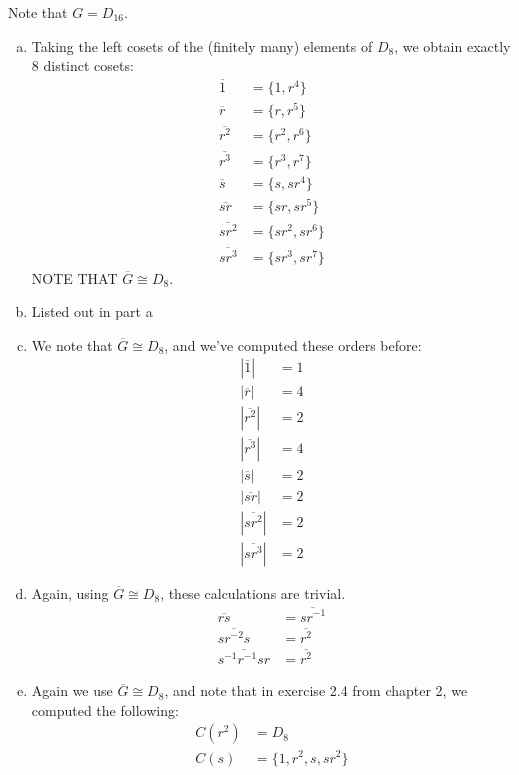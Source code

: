 \documentclass{article}
\newcommand{\set}[1]{ \{ #1 \} }
\newcommand{\abs}[1]{| #1 |}
\newcommand{\inv}[1]{ {#1}^{-1} }
\newcommand{\iso}{ \cong }
\renewcommand{\bar}{\overline}
\begin{document}
\subsubsection{}\label{ex1p17}
Note that $G = D_{16}$.\\
\begin{enumerate}[(a)]
\item
Taking the left cosets of the (finitely many) elements of $D_8$, we obtain exactly 8 distinct cosets:
\begin{align*}
\bar{1} &= \set{1,r^4}\\
\bar{r} &= \set{r,r^5}\\
\bar{r^2} &= \set{r^2,r^6}\\
\bar{r^3} &= \set{r^3,r^7}\\
\bar{s} &= \set{s,sr^4}\\
\bar{sr} &= \set{sr,sr^5}\\
\bar{sr^2} &= \set{sr^2,sr^6}\\
\bar{sr^3} &= \set{sr^3,sr^7}
\end{align*}
NOTE THAT $\bar{G} \iso D_8$.
\item Listed out in part a
\item We note that $\bar{G} \iso D_8$, and we've computed these orders before:
\begin{align*}
\abs{\bar{1}} &= 1\\
\abs{\bar{r}} &= 4\\
\abs{\bar{r^2}} &= 2\\
\abs{\bar{r^3}} &= 4\\
\abs{\bar{s}} &= 2\\
\abs{\bar{sr}} &= 2\\
\abs{\bar{sr^2}} &= 2\\
\abs{\bar{sr^3}} &= 2
\end{align*}
\item Again, using $\bar{G} \iso D_8$, these calculations are trivial.
\begin{align*}
\bar{rs} &= \bar{s\inv{r}}\\
\bar{sr^{-2}s} &= \bar{r^2}\\
\bar{\inv{s}\inv{r}sr} &= \bar{r^2}
\end{align*}
\item Again we use $\bar{G}\iso D_8$, and note that in exercise 2.4 from chapter 2, we computed the following:
\begin{align*}
C(r^2) &= D_8\\
C(s) &= \set{1, r^2, s, sr^2}
\end{align*}

\end{enumerate}
\end{document}
